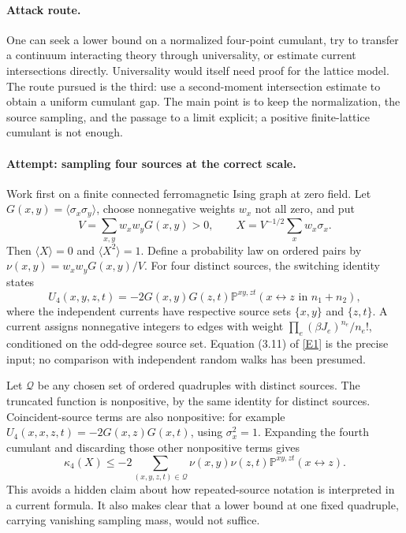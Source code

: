 \documentclass[11pt,a4paper]{article}
\numberwithin{equation}{section}
\newcommand{\eref}[2]{\hyperlink{extra:#1:#2}{[E#2]}}
\begin{document}
\paragraph{Attack route.}
One can seek a lower bound on a normalized four-point cumulant, try to
transfer a continuum interacting theory through universality, or estimate
current intersections directly. Universality would itself need proof for
the lattice model. The route pursued is the third: use a second-moment
intersection estimate to obtain a uniform cumulant gap. The main point is
to keep the normalization, the source sampling, and the passage to a limit
explicit; a positive finite-lattice cumulant is not enough.

\paragraph{Attempt: sampling four sources at the correct scale.}
Work first on a finite connected ferromagnetic Ising graph at zero field.
Let $G(x,y)=\langle\sigma_x\sigma_y\rangle$, choose nonnegative weights
$w_x$ not all zero, and put
\[
 V=\sum_{x,y}w_xw_yG(x,y)>0,
 \qquad X=V^{-1/2}\sum_xw_x\sigma_x.
\]
Then $\langle X\rangle=0$ and $\langle X^2\rangle=1$. Define a probability
law on ordered pairs by
$\nu(x,y)=w_xw_yG(x,y)/V$.
For four distinct sources, the switching identity states
\begin{equation}\label{eq73:current}
 U_4(x,y,z,t)=-2G(x,y)G(z,t)
   \mathbb P^{xy,zt}(x\leftrightarrow z\text{ in }n_1+n_2),
\end{equation}
where the independent currents have respective source sets $\{x,y\}$ and
$\{z,t\}$. A current assigns nonnegative integers to edges with weight
$\prod_e(\beta J_e)^{n_e}/n_e!$, conditioned on the odd-degree source set.
Equation (3.11) of \eref{statement}{1} is the precise input; no comparison with
independent random walks has been presumed.

Let $\mathcal Q$ be any chosen set of ordered quadruples with distinct
sources. The truncated function is nonpositive, by the same identity for
distinct sources. Coincident-source terms are also nonpositive: for example
$U_4(x,x,z,t)=-2G(x,z)G(x,t)$, using $\sigma_x^2=1$.
Expanding the fourth cumulant and discarding those other nonpositive terms
gives
\begin{equation}\label{eq73:weighted}
 \kappa_4(X)\leq-2\sum_{(x,y,z,t)\in\mathcal Q}
       \nu(x,y)\nu(z,t)
       \mathbb P^{xy,zt}(x\leftrightarrow z).
\end{equation}
This avoids a hidden claim about how repeated-source notation is interpreted
in a current formula. It also makes clear that a lower bound at one fixed
quadruple, carrying vanishing sampling mass, would not suffice.
\end{document}
